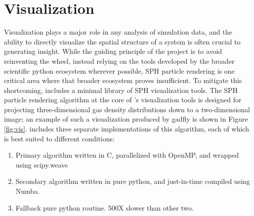 \section{Visualization}
\label{sec:vis}
Visualization plays a major role in any analysis of simulation data, and the ability to directly visualize the spatial structure of a system is often crucial to generating insight.
While the guiding principle of the  project is to avoid reinventing the wheel, instead relying on the tools developed by the broader scientific python ecosystem wherever possible, SPH particle rendering is one critical area where that broader ecosystem proves insufficient.  
To mitigate this shortcoming,  includes a minimal library of SPH visualization tools.
The SPH particle rendering algorithm at the core of 's visualization tools is designed for projecting three-dimensional gas density distributions down to a two-dimensional image; an example of such a visualization produced by gadfly is shown in Figure \ref{fig:vis}.
 includes three separate implementations of this algorithm, each of which is best suited to different conditions:
\begin{enumerate}
\item Primary algorithm written in C, parallelized with OpenMP, and wrapped using scipy.weave
\item Secondary algorithm written in pure python, and just-in-time compiled using Numba.
\item Fallback pure python routine.  500X slower than other two.
\end{enumerate}
